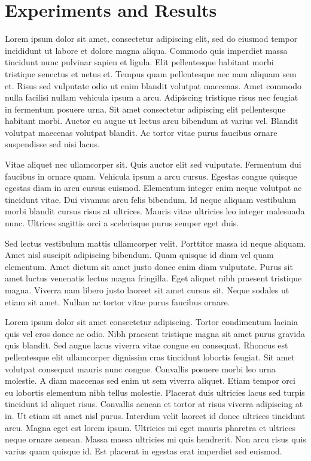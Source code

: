 \documentclass[conference]{IEEEtran}
\begin{document}
\section{Experiments and Results}
Lorem ipsum dolor sit amet, consectetur adipiscing elit, sed do eiusmod tempor incididunt ut labore et dolore magna aliqua. Commodo quis imperdiet massa tincidunt nunc pulvinar sapien et ligula. Elit pellentesque habitant morbi tristique senectus et netus et. Tempus quam pellentesque nec nam aliquam sem et. Risus sed vulputate odio ut enim blandit volutpat maecenas. Amet commodo nulla facilisi nullam vehicula ipsum a arcu. Adipiscing tristique risus nec feugiat in fermentum posuere urna. Sit amet consectetur adipiscing elit pellentesque habitant morbi. Auctor eu augue ut lectus arcu bibendum at varius vel. Blandit volutpat maecenas volutpat blandit. Ac tortor vitae purus faucibus ornare suspendisse sed nisi lacus.

Vitae aliquet nec ullamcorper sit. Quis auctor elit sed vulputate. Fermentum dui faucibus in ornare quam. Vehicula ipsum a arcu cursus. Egestas congue quisque egestas diam in arcu cursus euismod. Elementum integer enim neque volutpat ac tincidunt vitae. Dui vivamus arcu felis bibendum. Id neque aliquam vestibulum morbi blandit cursus risus at ultrices. Mauris vitae ultricies leo integer malesuada nunc. Ultrices sagittis orci a scelerisque purus semper eget duis.

Sed lectus vestibulum mattis ullamcorper velit. Porttitor massa id neque aliquam. Amet nisl suscipit adipiscing bibendum. Quam quisque id diam vel quam elementum. Amet dictum sit amet justo donec enim diam vulputate. Purus sit amet luctus venenatis lectus magna fringilla. Eget aliquet nibh praesent tristique magna. Viverra nam libero justo laoreet sit amet cursus sit. Neque sodales ut etiam sit amet. Nullam ac tortor vitae purus faucibus ornare.

Lorem ipsum dolor sit amet consectetur adipiscing. Tortor condimentum lacinia quis vel eros donec ac odio. Nibh praesent tristique magna sit amet purus gravida quis blandit. Sed augue lacus viverra vitae congue eu consequat. Rhoncus est pellentesque elit ullamcorper dignissim cras tincidunt lobortis feugiat. Sit amet volutpat consequat mauris nunc congue. Convallis posuere morbi leo urna molestie. A diam maecenas sed enim ut sem viverra aliquet. Etiam tempor orci eu lobortis elementum nibh tellus molestie. Placerat duis ultricies lacus sed turpis tincidunt id aliquet risus. Convallis aenean et tortor at risus viverra adipiscing at in. Ut etiam sit amet nisl purus. Interdum velit laoreet id donec ultrices tincidunt arcu. Magna eget est lorem ipsum. Ultricies mi eget mauris pharetra et ultrices neque ornare aenean. Massa massa ultricies mi quis hendrerit. Non arcu risus quis varius quam quisque id. Est placerat in egestas erat imperdiet sed euismod.
\end{document}
